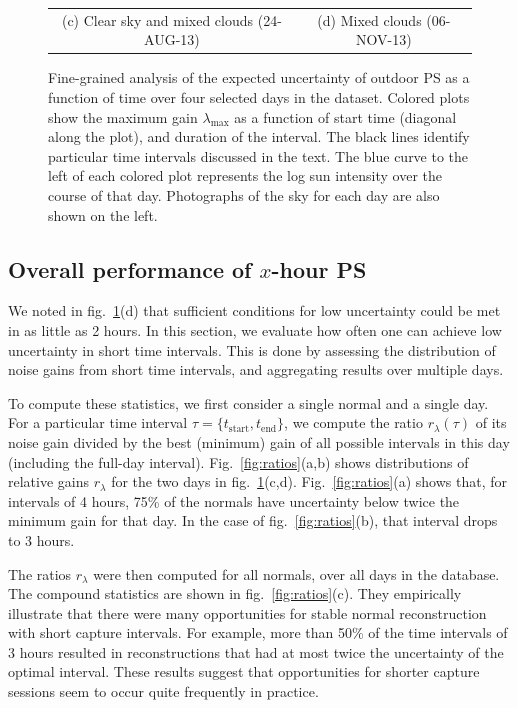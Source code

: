 \begin{figure}[!th]
\begin{tabular}{cc}
(c) Clear sky and mixed clouds (24-AUG-13) & (d) Mixed clouds (06-NOV-13)
\end{tabular}
\vspace{.25em}
\caption[Fine-grained analysis of PS uncertainty]{Fine-grained analysis of the expected uncertainty of outdoor PS as a function of time over four selected days in the dataset. Colored plots show the maximum gain $\lambda_\text{max}$ as a function of start time (diagonal along the plot), and duration of the interval. The black lines identify particular time intervals discussed in the text. The blue curve to the left of each colored plot represents the log sun intensity over the course of that day. Photographs of the sky for each day are also shown on the left.}
\label{fig:events}
\end{figure}

\subsection{Overall performance of $x$-hour PS} 

We noted in fig.~\ref{fig:events}(d) that sufficient conditions for low uncertainty could be met in as little as 2 hours. In this section, we evaluate how often one can achieve low uncertainty in short time intervals. This is done by assessing the distribution of noise gains from short time intervals, and aggregating results over multiple days.

To compute these statistics, we first consider a single normal and a single day. For a particular time interval \mbox{$\tau = \{t_\text{start}, t_\text{end}\}$}, we compute the ratio $r_\lambda(\tau)$ of its noise gain divided by the best (minimum) gain of all possible intervals in this day (including the full-day interval). Fig.~\ref{fig:ratios}(a,b) shows distributions of relative gains $r_\lambda$ for the two days in fig.~\ref{fig:events}(c,d). Fig.~\ref{fig:ratios}(a) shows that, for intervals of 4 hours, 75\% of the normals have uncertainty below twice the minimum gain for that day. In the case of fig.~\ref{fig:ratios}(b), that interval drops to 3 hours. 

The ratios $r_\lambda$ were then computed for all normals, over all days in the database. The compound statistics are shown in fig.~\ref{fig:ratios}(c). They empirically illustrate that there were many opportunities for stable normal reconstruction with short capture intervals. For example, more than 50\% of the time intervals of 3 hours resulted in reconstructions that had at most twice the uncertainty of the optimal interval. These results suggest that opportunities for shorter capture sessions seem to occur quite frequently in practice.

